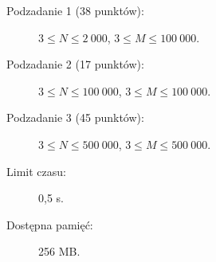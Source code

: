 \documentclass{boi2014-pl}
\begin{document}
    \Scoring

    \begin{description}
        \item[Podzadanie 1 (38 punktów):] $3 \le N \le 2\ 000$, $3 \le M \le 100\ 000$.
        \item[Podzadanie 2 (17 punktów):] $3 \le N \le 100\ 000$, $3 \le M \le 100\ 000$.
        \item[Podzadanie 3 (45 punktów):] $3 \le N \le 500\ 000$, $3 \le M \le 500\ 000$.
    \end{description}

    \Constraints

    \begin{description}
        \item[Limit czasu:] 0,5 s.
        \item[Dostępna pamięć:] 256 MB.
    \end{description}
\end{document}
